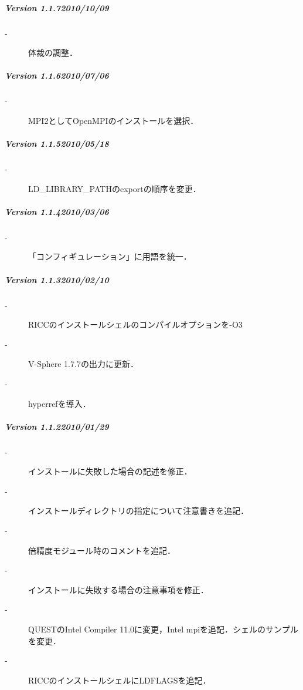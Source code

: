 %
\subparagraph{Version 1.1.7\hspace{1cm}2010/10/09}
\label{v117}

\begin{description}
\item[-] 体裁の調整．
\end{description}
\vspace{2mm}

%
\subparagraph{Version 1.1.6\hspace{1cm}2010/07/06}
\label{v116}

\begin{description}
\item[-] MPI2としてOpenMPIのインストールを選択．
\end{description}
\vspace{2mm}

%
\subparagraph{Version 1.1.5\hspace{1cm}2010/05/18}
\label{v115}

\begin{description}
\item[-] LD\_LIBRARY\_PATHのexportの順序を変更．
\end{description}
\vspace{2mm}


%
\subparagraph{Version 1.1.4\hspace{1cm}2010/03/06}
\label{v114}

\begin{description}
\item[-] 「コンフィギュレーション」に用語を統一．
\end{description}
\vspace{2mm}

%
\subparagraph{Version 1.1.3\hspace{1cm}2010/02/10}
\label{v113}

\begin{description}
\item[-] RICCのインストールシェルのコンパイルオプションを-O3
\item[-] V-Sphere 1.7.7の出力に更新．
\item[-] hyperrefを導入．
\end{description}
\vspace{2mm}

%
\subparagraph{Version 1.1.2\hspace{1cm}2010/01/29}
\label{v112}

\begin{description}
\item[-] インストールに失敗した場合の記述を修正．
\item[-] インストールディレクトリの指定について注意書きを追記．
\item[-] 倍精度モジュール時のコメントを追記．
\item[-] インストールに失敗する場合の注意事項を修正．
\item[-] QUESTのIntel Compiler 11.0に変更，Intel mpiを追記．シェルのサンプルを変更．
\item[-] RICCのインストールシェルにLDFLAGSを追記．
\end{description}
\vspace{2mm}

